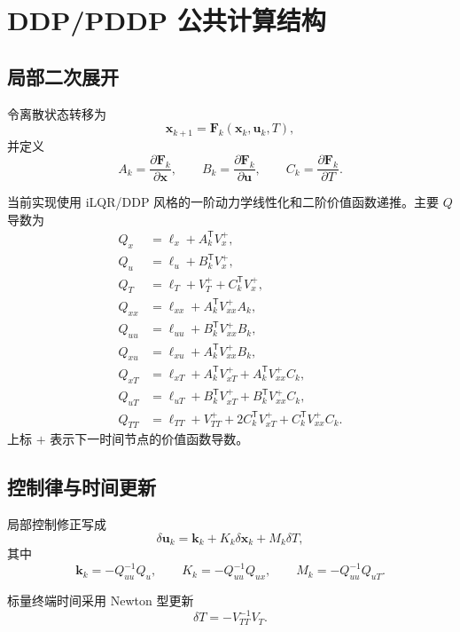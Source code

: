 \documentclass[UTF8,zihao=-4,openany,fontset=fandol]{ctexbook}
\begin{document}
\chapter{DDP/PDDP 公共计算结构}

\section{局部二次展开}

令离散状态转移为
\[
  \bm{x}_{k+1}=\bm{F}_k(\bm{x}_k,\bm{u}_k,T),
\]
并定义
\[
  A_k=\frac{\partial\bm{F}_k}{\partial\bm{x}},
  \qquad
  B_k=\frac{\partial\bm{F}_k}{\partial\bm{u}},
  \qquad
  C_k=\frac{\partial\bm{F}_k}{\partial T}.
\]

当前实现使用 iLQR/DDP 风格的一阶动力学线性化和二阶价值函数递推。主要 $Q$ 导数为
\begin{align}
  Q_x &= \ell_x+A_k^\mathsf{T}V_x^+,\\
  Q_u &= \ell_u+B_k^\mathsf{T}V_x^+,\\
  Q_T &= \ell_T+V_T^++C_k^\mathsf{T}V_x^+,\\
  Q_{xx} &= \ell_{xx}+A_k^\mathsf{T}V_{xx}^+A_k,\\
  Q_{uu} &= \ell_{uu}+B_k^\mathsf{T}V_{xx}^+B_k,\\
  Q_{xu} &= \ell_{xu}+A_k^\mathsf{T}V_{xx}^+B_k,\\
  Q_{xT} &= \ell_{xT}+A_k^\mathsf{T}V_{xT}^+
            +A_k^\mathsf{T}V_{xx}^+C_k,\\
  Q_{uT} &= \ell_{uT}+B_k^\mathsf{T}V_{xT}^+
            +B_k^\mathsf{T}V_{xx}^+C_k,\\
  Q_{TT} &= \ell_{TT}+V_{TT}^+
            +2C_k^\mathsf{T}V_{xT}^+
            +C_k^\mathsf{T}V_{xx}^+C_k.
\end{align}
上标 $+$ 表示下一时间节点的价值函数导数。

\section{控制律与时间更新}

局部控制修正写成
\begin{equation}
  \delta\bm{u}_k
  =
  \bm{k}_k+K_k\delta\bm{x}_k+M_k\delta T ,
\end{equation}
其中
\begin{equation}
  \bm{k}_k=-Q_{uu}^{-1}Q_u,\qquad
  K_k=-Q_{uu}^{-1}Q_{ux},\qquad
  M_k=-Q_{uu}^{-1}Q_{uT}.
\end{equation}

标量终端时间采用 Newton 型更新
\begin{equation}
  \delta T=-V_{TT}^{-1}V_T.
\end{equation}
\end{document}
